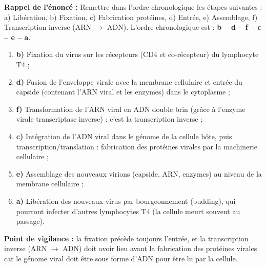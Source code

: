 \documentclass[11pt]{article}
\newcommand{\cle}[1]{{\popxbold\color{popdark}#1}}
\begin{document}
\begin{corrige}
\textbf{Rappel de l'énoncé :} Remettre dans l'ordre chronologique les étapes suivantes : a) Libération, b) Fixation, c) Fabrication protéines, d) Entrée, e) Assemblage, f) Transcription inverse (ARN $\to$ ADN).
\tcblower
L'ordre chronologique est : \textbf{b -- d -- f -- c -- e -- a}.
\begin{enumerate}
\item \textbf{b)} Fixation du virus sur les récepteurs (CD4 et co-récepteur) du lymphocyte T4 ;
\item \textbf{d)} Fusion de l'enveloppe virale avec la membrane cellulaire et entrée du capside (contenant l'ARN viral et les enzymes) dans le cytoplasme ;
\item \textbf{f)} Transformation de l'ARN viral en ADN double brin (grâce à l'enzyme virale \cle{transcriptase inverse}) : c'est la \cle{transcription inverse} ;
\item \textbf{c)} Intégration de l'ADN viral dans le génome de la cellule hôte, puis transcription/translation : fabrication des protéines virales par la machinerie cellulaire ;
\item \textbf{e)} Assemblage des nouveaux virions (capside, ARN, enzymes) au niveau de la membrane cellulaire ;
\item \textbf{a)} Libération des nouveaux virus par bourgeonnement (budding), qui pourront infecter d'autres lymphocytes T4 (la cellule meurt souvent au passage).
\end{enumerate}
\textbf{Point de vigilance :} la fixation précède toujours l'entrée, et la transcription inverse (ARN $\to$ ADN) doit avoir lieu avant la fabrication des protéines virales car le génome viral doit être sous forme d'ADN pour être lu par la cellule.
\end{corrige}
\end{document}
